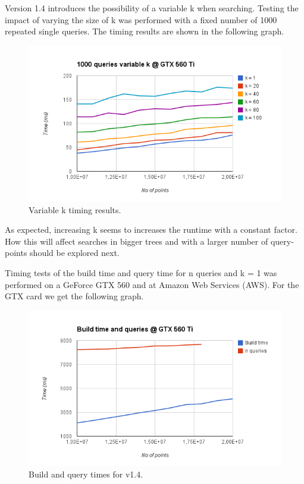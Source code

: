 Version 1.4 introduces the possibility of a variable k when searching. Testing the impact of varying the size of k was performed with a fixed number of 1000 repeated single queries. The timing results are shown in the following graph.

\begin{figure}[ht!]
\centering
\includegraphics[width=120mm]{../gfx/v14_variable_k.png}

\caption{Variable k timing results.}
\label{fig:v14_variable_k}
\end{figure}

As expected, increasing k seems to increases the runtime with a constant factor. How this will affect searches in bigger trees and with a larger number of query-points should be explored next.

Timing tests of the build time and query time for n queries and k = 1 was performed on a GeForce GTX 560 and at Amazon Web Services (AWS). For the GTX card we get the following graph.

\begin{figure}[ht!]
\centering
\includegraphics[width=120mm]{../gfx/v14_build_query_gtx.png}

\caption{Build and query times for v1.4.}
\label{fig:v14_build_query_gtx}
\end{figure}

